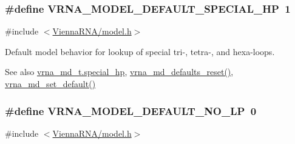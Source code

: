 \subsubsection[{\texorpdfstring{V\+R\+N\+A\+\_\+\+M\+O\+D\+E\+L\+\_\+\+D\+E\+F\+A\+U\+L\+T\+\_\+\+S\+P\+E\+C\+I\+A\+L\+\_\+\+HP}{VRNA_MODEL_DEFAULT_SPECIAL_HP}}]{\setlength{\rightskip}{0pt plus 5cm}\#define V\+R\+N\+A\+\_\+\+M\+O\+D\+E\+L\+\_\+\+D\+E\+F\+A\+U\+L\+T\+\_\+\+S\+P\+E\+C\+I\+A\+L\+\_\+\+HP~1}\hypertarget{group__model__details_gabd1ab224e1048defd45c165ed7d1c108}{}\label{group__model__details_gabd1ab224e1048defd45c165ed7d1c108}


{\ttfamily \#include $<$\hyperlink{model_8h}{Vienna\+R\+N\+A/model.\+h}$>$}



Default model behavior for lookup of special tri-\/, tetra-\/, and hexa-\/loops. 

\begin{DoxySeeAlso}{See also}
\hyperlink{group__model__details_add64a96d23e77ef1d0ddf8dfc5228143}{vrna\+\_\+md\+\_\+t.\+special\+\_\+hp}, \hyperlink{group__model__details_ga70834424cf804d149937de89f80ceb45}{vrna\+\_\+md\+\_\+defaults\+\_\+reset()}, \hyperlink{group__model__details_ga8ac6ff84936282436f822644bf841f66}{vrna\+\_\+md\+\_\+set\+\_\+default()} 
\end{DoxySeeAlso}
\subsubsection[{\texorpdfstring{V\+R\+N\+A\+\_\+\+M\+O\+D\+E\+L\+\_\+\+D\+E\+F\+A\+U\+L\+T\+\_\+\+N\+O\+\_\+\+LP}{VRNA_MODEL_DEFAULT_NO_LP}}]{\setlength{\rightskip}{0pt plus 5cm}\#define V\+R\+N\+A\+\_\+\+M\+O\+D\+E\+L\+\_\+\+D\+E\+F\+A\+U\+L\+T\+\_\+\+N\+O\+\_\+\+LP~0}\hypertarget{group__model__details_gab72462726dd60ed0d43339bbf7ee08ad}{}\label{group__model__details_gab72462726dd60ed0d43339bbf7ee08ad}


{\ttfamily \#include $<$\hyperlink{model_8h}{Vienna\+R\+N\+A/model.\+h}$>$}




